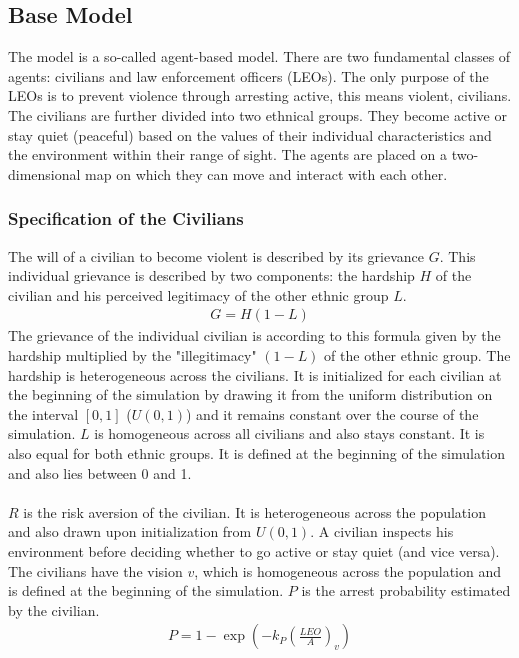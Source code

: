 \documentclass[11pt]{article}
\begin{document}
\subsection{Base Model}
\label{subsec:base_model}
The model is a so-called agent-based model. There are two fundamental classes of agents: civilians and law enforcement officers (LEOs). The only purpose of the LEOs is to prevent violence through arresting active, this means violent, civilians. The civilians are further divided into two ethnical groups. They become active or stay quiet (peaceful) based on the values of their individual characteristics and the environment within their range of sight. The agents are placed on a two-dimensional map on which they can move and interact with each other.

\subsubsection{Specification of the Civilians}
The will of a civilian to become violent is described by its grievance $G$. This individual grievance is described by two components: the hardship $H$ of the civilian and his perceived legitimacy of the other ethnic group $L$.
\begin{align}
G = H (1 - L)
\end{align}
The grievance of the individual civilian is according to this formula given by the hardship multiplied by the "illegitimacy" $(1 - L)$ of the other ethnic group. The hardship is heterogeneous across the civilians. It is initialized for each civilian at the beginning of the simulation by drawing it from the uniform distribution on the interval $[0,1]$ ($U(0,1)$) and it remains constant over the course of the simulation. $L$ is homogeneous across all civilians and also stays constant. It is also equal for both ethnic groups. It is defined at the beginning of the simulation and also lies between 0 and 1.\\
\\
$R$ is the risk aversion of the civilian. It is heterogeneous across the population and also drawn upon initialization from $U(0,1)$. A civilian inspects his environment before deciding whether to go active or stay quiet (and vice versa). The civilians have the vision $v$, which is homogeneous across the population and is defined at the beginning of the simulation. $P$ is the arrest probability estimated by the civilian.
\begin{align}
P = 1 - \exp \left( - k_P \left( \frac{LEO}{A} \right)_v \right)
\end{align}
\end{document}
